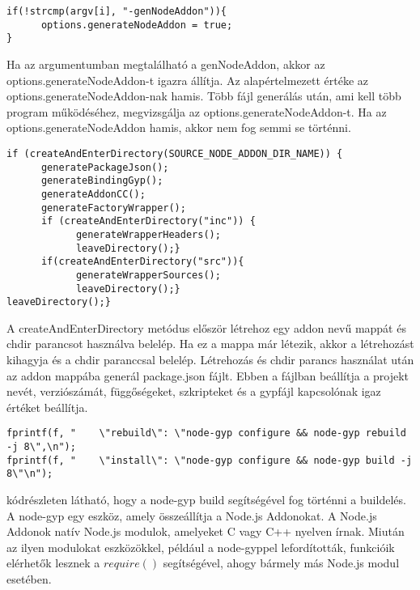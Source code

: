 \begin{lstlisting}[caption={SchemaGenerator kapcsoló vizsgálás},label={lst:schemagenerator_argv_genNodeAddon}, language={CStyle}]
if(!strcmp(argv[i], "-genNodeAddon")){
      options.generateNodeAddon = true;
}
\end{lstlisting}

Ha az argumentumban megtalálható a genNodeAddon, akkor az options.generateNodeAddon-t igazra állítja.
Az alapértelmezett értéke az options.generateNodeAddon-nak hamis.
Több fájl generálás után, ami kell több program működéséhez, megvizsgálja az options.generateNodeAddon-t.
Ha az options.generateNodeAddon hamis, akkor nem fog semmi se történni.

\begin{lstlisting}[caption={SchemaGenerator JavaScriptAddon generálás},label={lst:schemagenerator_genNodeAddon_check}, language={CStyle}]
if (createAndEnterDirectory(SOURCE_NODE_ADDON_DIR_NAME)) {
      generatePackageJson();
      generateBindingGyp();
      generateAddonCC();
      generateFactoryWrapper();
      if (createAndEnterDirectory("inc")) {
            generateWrapperHeaders();
            leaveDirectory();}
      if(createAndEnterDirectory("src")){
            generateWrapperSources();
            leaveDirectory();}
leaveDirectory();}
\end{lstlisting}

A createAndEnterDirectory metódus először létrehoz egy addon nevű mappát és chdir parancsot használva belelép.
Ha ez a mappa már létezik, akkor a létrehozást kihagyja és a chdir paranccsal belelép.
Létrehozás és chdir parancs használat után az addon mappába generál package.json fájlt.
Ebben a fájlban beállítja a projekt nevét, verziószámát, függőségeket, szkripteket és a gypfájl kapcsolónak igaz értéket beállítja.

\begin{lstlisting}[caption={NodeAddonGenerator package.json szkriptek}, label={lst:nodeAddonGenerator_package_json}, language={CStyle}]
fprintf(f, "    \"rebuild\": \"node-gyp configure && node-gyp rebuild -j 8\",\n");
fprintf(f, "    \"install\": \"node-gyp configure && node-gyp build -j 8\"\n");
\end{lstlisting}

 kódrészleten látható, hogy a node-gyp build segítségével fog történni a buildelés.
A node-gyp egy eszköz, amely összeállítja a Node.js Addonokat. A Node.js Addonok natív Node.js modulok, amelyeket C vagy C++ nyelven írnak.
Miután az ilyen modulokat eszközökkel, például a node-gyppel lefordították, funkcióik elérhetők lesznek a $require()$ segítségével, ahogy bármely más Node.js modul esetében.

